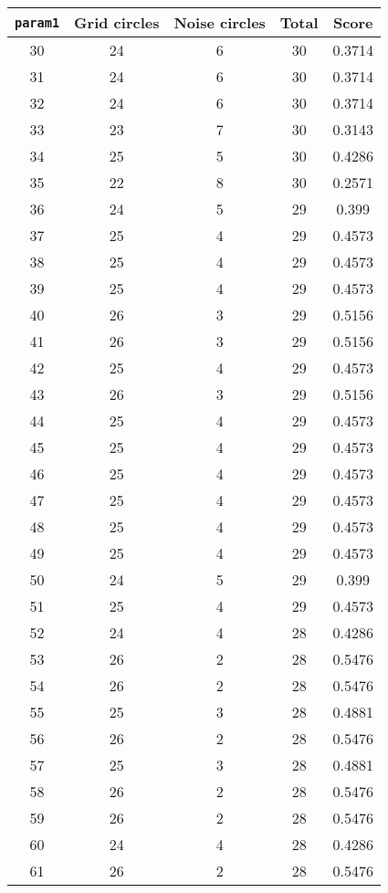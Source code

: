 \documentclass[letterpaper, 12pt]{article}
\begin{document}
\begin{longtable}{|c|c|c|c|c|}
\hline
\textbf{\texttt{param1}} & \textbf{Grid circles} & \textbf{Noise circles} & \textbf{Total} & \textbf{Score} \\
\hline
30 & 24 & 6 & 30 & 0.3714 \\
\hline
31 & 24 & 6 & 30 & 0.3714 \\
\hline
32 & 24 & 6 & 30 & 0.3714 \\
\hline
33 & 23 & 7 & 30 & 0.3143 \\
\hline
34 & 25 & 5 & 30 & 0.4286 \\
\hline
35 & 22 & 8 & 30 & 0.2571 \\
\hline
36 & 24 & 5 & 29 & 0.399 \\
\hline
37 & 25 & 4 & 29 & 0.4573 \\
\hline
38 & 25 & 4 & 29 & 0.4573 \\
\hline
39 & 25 & 4 & 29 & 0.4573 \\
\hline
40 & 26 & 3 & 29 & 0.5156 \\
\hline
41 & 26 & 3 & 29 & 0.5156 \\
\hline
42 & 25 & 4 & 29 & 0.4573 \\
\hline
43 & 26 & 3 & 29 & 0.5156 \\
\hline
44 & 25 & 4 & 29 & 0.4573 \\
\hline
45 & 25 & 4 & 29 & 0.4573 \\
\hline
46 & 25 & 4 & 29 & 0.4573 \\
\hline
47 & 25 & 4 & 29 & 0.4573 \\
\hline
48 & 25 & 4 & 29 & 0.4573 \\
\hline
49 & 25 & 4 & 29 & 0.4573 \\
\hline
50 & 24 & 5 & 29 & 0.399 \\
\hline
51 & 25 & 4 & 29 & 0.4573 \\
\hline
52 & 24 & 4 & 28 & 0.4286 \\
\hline
53 & 26 & 2 & 28 & 0.5476 \\
\hline
54 & 26 & 2 & 28 & 0.5476 \\
\hline
55 & 25 & 3 & 28 & 0.4881 \\
\hline
56 & 26 & 2 & 28 & 0.5476 \\
\hline
57 & 25 & 3 & 28 & 0.4881 \\
\hline
58 & 26 & 2 & 28 & 0.5476 \\
\hline
59 & 26 & 2 & 28 & 0.5476 \\
\hline
60 & 24 & 4 & 28 & 0.4286 \\
\hline
61 & 26 & 2 & 28 & 0.5476 \\

\end{longtable}
\end{document}
